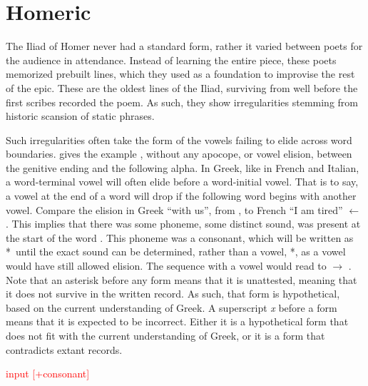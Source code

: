 \section{Homeric}\label{sec:Homeric}
 The Iliad of Homer never had a standard form, rather it varied between poets for the audience in attendance. Instead of learning the entire piece, these poets memorized prebuilt lines, which they used as a foundation to improvise the rest of the epic. These are the oldest lines of the Iliad, surviving from well before the first scribes recorded the poem. As such, they show irregularities stemming from historic scansion of static phrases.

 Such irregularities often take the form of the vowels failing to elide across word boundaries.  gives the example ,\autocite[XV.214]{Iliad_1999} without any apocope, or vowel elision, between the genitive ending  and the following alpha. In Greek, like in French and Italian, a word-terminal vowel will often elide before a word-initial vowel. That is to say, a vowel at the end of a word will drop if the following word begins with another vowel. Compare the elision in Greek   ``with us'', from , to French   ``I am tired'' $\gets$ . This implies that there was some phoneme, some distinct sound, was present at the start of the word . This phoneme was a consonant, which will be written as *\w\ until the exact sound can be determined, rather than a vowel, *\vowel, as a vowel would have still allowed elision. The sequence with a vowel would read  to  $\to$ . Note that an asterisk before any form means that it is unattested, meaning that it does not survive in the written record. As such, that form is hypothetical, based on the current understanding of Greek. A superscript \textit{x} before a form means that it is expected to be incorrect. Either it is a hypothetical form that does not fit with the current understanding of Greek, or it is a form that contradicts extant records.

\noindent\textcolor{red}{input [+consonant]}

